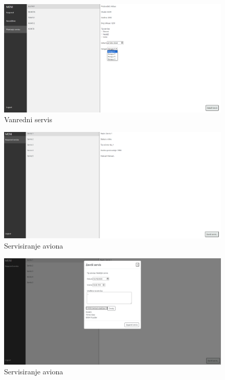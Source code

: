 \documentclass[a4paper]{article}
\begin{document}
\begin{figure}[H]
\begin{center}
\includegraphics[scale=0.3]{UI/vandredni_servis_4.png}
\end{center}
\caption{Vanredni servis}
\label{fig:ui_vanredni_4}
\end{figure}

\begin{figure}[H]
\begin{center}
\includegraphics[scale=0.3]{UI/servisiranje_aviona.png}
\end{center}
\caption{Servisiranje aviona}
\label{fig:ui_servisiranje_aviona_1}
\end{figure}

\begin{figure}[H]
\begin{center}
\includegraphics[scale=0.3]{UI/servisiranje_aviona_2.png}
\end{center}
\caption{Servisiranje aviona}
\label{fig:ui_servisiranje_aviona_2}
\end{figure}
\end{document}

